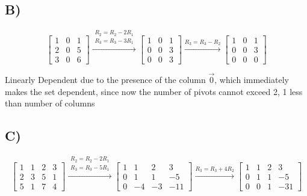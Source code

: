 \documentclass{article}
\begin{document}
\subsection*{B)}

\[
	\begin{bmatrix}
		1 & 0 & 1 \\
		2 & 0 & 5 \\
		3 & 0 & 6
	\end{bmatrix}
	\xrightarrow{
		\begin{aligned}
			R_2 = R_2 - 2R_1 \\
			R_3 = R_3 - 3R_1
		\end{aligned}
	}
	\begin{bmatrix}
		1 & 0 & 1 \\
		0 & 0 & 3 \\
		0 & 0 & 3
	\end{bmatrix}
	\xrightarrow{
		R_3=R_3-R_2
	}
	\begin{bmatrix}
		1 & 0 & 1 \\
		0 & 0 & 3 \\
		0 & 0 & 0
	\end{bmatrix}
\]

Linearly Dependent due to the presence of the column \(\vec{0}\), which immediately makes the set dependent, since now the number of pivots cannot exceed 2, 1 less than number of columns

\subsection*{C)}

\[
	\begin{bmatrix}
		1 & 1 & 2 & 3 \\
		2 & 3 & 5 & 1 \\
		5 & 1 & 7 & 4
	\end{bmatrix}
	\xrightarrow{
		\begin{aligned}
			R_2 = R_2 - 2R_1 \\
			R_3 = R_3 - 5R_1
		\end{aligned}
	}
	\begin{bmatrix}
		1 & 1  & 2  & 3   \\
		0 & 1  & 1  & -5  \\
		0 & -4 & -3 & -11
	\end{bmatrix}
	\xrightarrow{
		R_3 = R_3 + 4R_2
	}
	\begin{bmatrix}
		1 & 1 & 2 & 3   \\
		0 & 1 & 1 & -5  \\
		0 & 0 & 1 & -31
	\end{bmatrix}
\]
\end{document}
